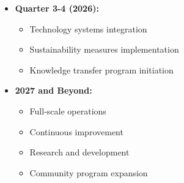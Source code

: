 \begin{itemize}
    \item \textbf{Quarter 3-4 (2026):}
    \begin{itemize}
        \item Technology systems integration
        \item Sustainability measures implementation
        \item Knowledge transfer program initiation
    \end{itemize}
    
    \item \textbf{2027 and Beyond:}
    \begin{itemize}
        \item Full-scale operations
        \item Continuous improvement
        \item Research and development
        \item Community program expansion
    \end{itemize}
\end{itemize}

